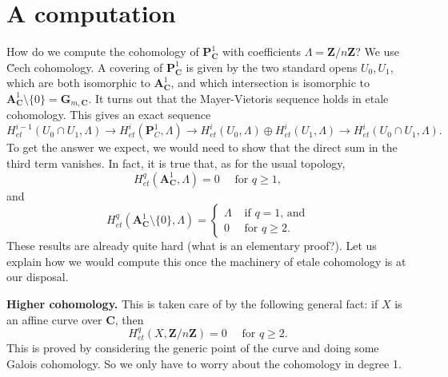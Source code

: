 \section{A computation}
\label{section-computation}

\noindent
How do we compute the cohomology of $\mathbf{P}^1_\mathbf{C}$ with coefficients
$\Lambda = \mathbf{Z}/n\mathbf{Z}$?
We use \u Cech cohomology. A covering of $\mathbf{P}^1_\mathbf{C}$ is given by
the two standard opens $U_0, U_1$, which are both
isomorphic to $\mathbf{A}^1_\mathbf{C}$, and which intersection is isomorphic
to $\mathbf{A}^1_\mathbf{C} \setminus \{0\} = \mathbf{G}_{m, \mathbf{C}}$.
It turns out that the Mayer-Vietoris sequence holds in etale cohomology.
This gives an exact sequence
$$
H_{et}^{i-1}(U_0\cap U_1, \Lambda) \to
H_{et}^i(\mathbf{P}^1_C, \Lambda) \to H_{et}^i(U_0, \Lambda) \oplus
H_{et}^i(U_1, \Lambda) \to H_{et}^i(U_0\cap U_1,
\Lambda).
$$
To get the answer we expect, we would need to show that the direct sum in the
third term vanishes. In fact, it is true that, as for the usual topology,
$$
H_{et}^q (\mathbf{A}^1_\mathbf{C}, \Lambda) = 0 \quad \text{ for } q \geq 1,
$$
and
$$
H_{et}^q (\mathbf{A}^1_\mathbf{C} \setminus \{0\}, \Lambda) = \left\{
\begin{matrix}
\Lambda & \text{ if $q = 1$, and} \\
0 & \text{ for $q \geq 2$.}
\end{matrix}
\right.
$$
These results are already quite hard (what is an elementary proof?). Let us
explain how we would compute this once the machinery of etale cohomology is
at our disposal.

\medskip\noindent
{\bf Higher cohomology.} This is taken care of by the following general
fact: if $X$ is an affine curve over $\mathbf{C}$, then
$$
H_{et}^q (X, \mathbf{Z}/n\mathbf{Z}) = 0 \quad \text{ for } q \geq 2.
$$
This is proved by considering the generic point of the curve and doing some
Galois cohomology. So we only have to worry about the cohomology in degree 1.

